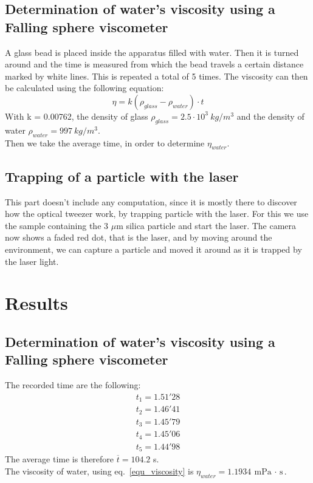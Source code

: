 \documentclass{article}
\begin{document}
\subsection{Determination of water's viscosity using a Falling sphere viscometer}
A glass bead is placed inside the apparatus filled with water. Then it is turned around and the time is measured from which the bead travels a certain distance marked by white lines. This is repeated a total of 5 times.
The viscosity can then be calculated using the following equation:
\begin{equation}
    \eta = k(\rho_{glass} -\rho_{water})\cdot t
    \label{equ_viscosity}
\end{equation}
With k = 0.00762, the density of glass $\rho_{glass}=2.5 \cdot 10^3 \ kg/m^3$  and the density of water $\rho_{water}=997 \ kg/m^3$. \\
Then we take the average time, in order to determine $\eta_{water}$.

\subsection{Trapping of a particle with the laser}
This part doesn't include any computation, since it is mostly there to discover how the optical tweezer work, by trapping particle with the laser. For this we use the sample containing the 3 $\mu$m silica particle and start the laser. The camera now shows a faded red dot, that is the laser, and by moving around the environment, we can capture a particle and moved it around as it is trapped by the laser light.

\section{Results}

\subsection{Determination of water's viscosity using a Falling sphere viscometer}
The recorded time are the following:
\[
\begin{array}{cc}
     t_1 = 1.51'28\\
     t_2 = 1.46'41\\
     t_3 = 1.45'79\\
     t_4 = 1.45'06\\
     t_5 = 1.44'98
\end{array}\]
The average time is therefore $\overline{t} = 104.2$ s.\\
The viscosity of water, using eq.~\ref{equ_viscosity} is $\boxed{\eta_{water} = 1.1934 \ \text{mPa $\cdot$ s}}$. 
\end{document}
